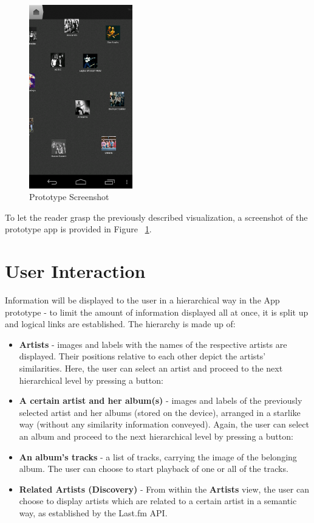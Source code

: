 \begin{figure}[H]
  \centering
    \includegraphics[width=0.4\textwidth]{figures/screen_mds_10_after_all_uncollided_nodes}
  \caption{Prototype Screenshot}
  \label{fig:prototype_screenshot}
\end{figure}

To let the reader grasp the previously described visualization, a screenshot of the prototype app is provided in Figure ~\ref{fig:prototype_screenshot}.

\section{User Interaction}

Information will be displayed to the user in a hierarchical way in the App prototype - to limit the amount of information displayed all at once, it is split up and logical links are established. The hierarchy is made up of:

\begin{itemize}
	\item \textbf{Artists} - images and labels with the names of the respective artists are displayed. Their positions relative to each other depict the artists' similarities. Here, the user can select an artist and proceed to the next hierarchical level by pressing a button:
	\item \textbf{A certain artist and her album(s)} - images and labels of the previously selected artist and her albums (stored on the device), arranged in a starlike way (without any similarity information conveyed). Again, the user can select an album and proceed to the next hierarchical level by pressing a button:
	\item \textbf{An album's tracks} - a list of tracks, carrying the image of the belonging album. The user can choose to start playback of one or all of the tracks.
	\item \textbf{Related Artists (Discovery)} - From within the \textbf{Artists} view, the user can choose to display artists which are related to a certain artist in a semantic way, as established by the Last.fm API.
	
\end{itemize}



